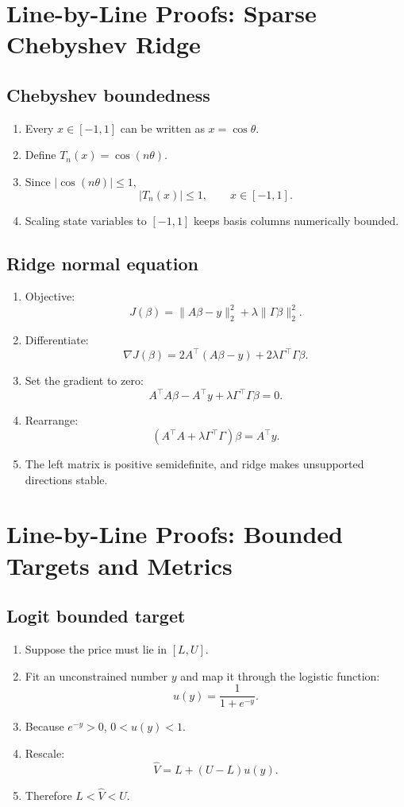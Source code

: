\documentclass[11pt,oneside]{book}
\theoremstyle{definition}
\newenvironment{proofsteps}
{\begin{enumerate}[label=\textbf{Line \arabic*.}, itemsep=0.35em]}
{\end{enumerate}}
\begin{document}
\chapter{Line-by-Line Proofs: Sparse Chebyshev Ridge}

\section{Chebyshev boundedness}
\begin{proofsteps}
\item Every \(x\in[-1,1]\) can be written as \(x=\cos\theta\).
\item Define \(T_n(x)=\cos(n\theta)\).
\item Since \(|\cos(n\theta)|\le1\),
\[
|T_n(x)|\le1,\qquad x\in[-1,1].
\]
\item Scaling state variables to \([-1,1]\) keeps basis columns numerically bounded.
\end{proofsteps}

\section{Ridge normal equation}
\begin{proofsteps}
\item Objective:
\[
J(\beta)=\|A\beta-y\|_2^2+\lambda\|\Gamma\beta\|_2^2.
\]
\item Differentiate:
\[
\nabla J(\beta)=2A^\top(A\beta-y)+2\lambda\Gamma^\top\Gamma\beta.
\]
\item Set the gradient to zero:
\[
A^\top A\beta-A^\top y+\lambda\Gamma^\top\Gamma\beta=0.
\]
\item Rearrange:
\[
(A^\top A+\lambda\Gamma^\top\Gamma)\beta=A^\top y.
\]
\item The left matrix is positive semidefinite, and ridge makes unsupported directions stable.
\end{proofsteps}

\chapter{Line-by-Line Proofs: Bounded Targets and Metrics}

\section{Logit bounded target}
\begin{proofsteps}
\item Suppose the price must lie in \([L,U]\).
\item Fit an unconstrained number \(y\) and map it through the logistic function:
\[
u(y)=\frac{1}{1+e^{-y}}.
\]
\item Because \(e^{-y}>0\), \(0<u(y)<1\).
\item Rescale:
\[
\widehat V=L+(U-L)u(y).
\]
\item Therefore \(L<\widehat V<U\).
\end{proofsteps}
\end{document}
